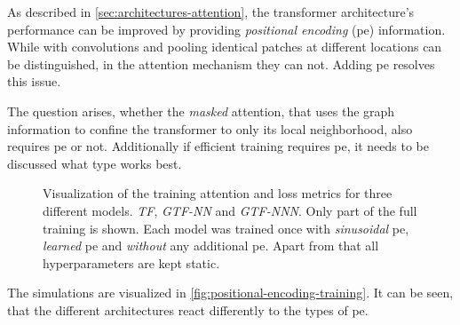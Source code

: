As described in \autoref{sec:architectures-attention}, the transformer architecture's performance can be improved by providing  \emph{positional encoding} (pe) information.
While with convolutions and pooling identical patches at different locations can be distinguished, in the attention mechanism they can not.
Adding pe resolves this issue.

The question arises, whether the \emph{masked} attention, that uses the graph information to confine the transformer to only its local neighborhood, also requires pe or not. 
Additionally if efficient training requires pe, it needs to be discussed what type works best.

\begin{figure}[htbp]
    \centering
    \caption{Visualization of the training attention and loss metrics for three different models. \emph{TF}, \emph{GTF-NN} and \emph{GTF-NNN}.
    Only part of the full training is shown. 
    Each model was trained once with \emph{sinusoidal} pe, \emph{learned} pe and \emph{without} any additional pe.
    Apart from that all hyperparameters are kept static.
    }
    \label{fig:positional-encoding-training}
\end{figure}

The simulations are visualized in \autoref{fig:positional-encoding-training}.
It can be seen, that the different architectures react differently to the types of pe.

